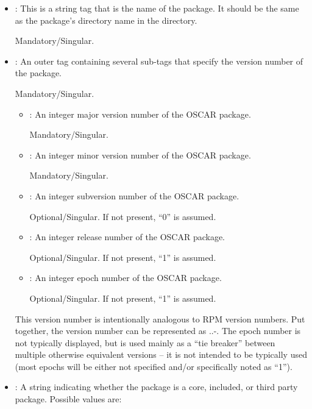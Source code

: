 \begin{itemize}
\item {}: This is a string tag that is the name
  of the package.  It should be the same as the package's directory
  name in the  directory.

  Mandatory/Singular.
  
\item {}: An outer tag containing several sub-tags that
  specify the version number of the package.

  Mandatory/Singular.
  
  \begin{itemize}
  \item {}: An integer major version number of
    the OSCAR package.

    Mandatory/Singular.
    
  \item {}: An integer minor version number of the OSCAR
    package.

    Mandatory/Singular.
    
  \item {}: An integer subversion number of the OSCAR
    package.
    
    Optional/Singular.  If not present, ``0'' is assumed.
    
  \item {}: An integer release number of the OSCAR
    package.
    
    Optional/Singular.  If not present, ``1'' is assumed.
    
  \item {}: An integer epoch number of the OSCAR package.
    
    Optional/Singular.  If not present, ``1'' is assumed.
  \end{itemize}
  
  This version number is intentionally analogous to RPM version numbers.
  Put together, the version number can be represented as
  ..-.
  The epoch number is not typically displayed, but is used mainly as a
  ``tie breaker'' between multiple otherwise equivalent versions -- it
  is not intended to be typically used (most epochs will be either not
  specified and/or specifically noted as ``1'').
  
\item {}: A string indicating whether the package is a
  core, included, or third party package.  Possible values are:


\end{itemize}
